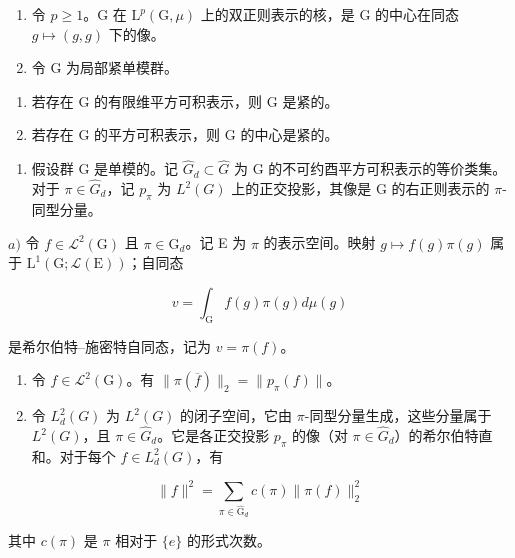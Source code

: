 \begin{enumerate}
\def\labelenumi{\arabic{enumi})}
\setcounter{enumi}{3}
\item
  令 \(p \geqslant 1\)。G 在 \(\mathrm{L}^{p}(\mathrm{G}, \mu)\) 上的双正则表示的核，是 G 的中心在同态 \(g \mapsto (g, g)\) 下的像。
\item
  令 G 为局部紧单模群。
\end{enumerate}

\begin{enumerate}
\def\labelenumi{\alph{enumi})}
\item
  若存在 G 的有限维平方可积表示，则 G 是紧的。
\item
  若存在 G 的平方可积表示，则 G 的中心是紧的。
\end{enumerate}

\begin{enumerate}
\def\labelenumi{\arabic{enumi})}
\setcounter{enumi}{5}
\tightlist
\item
  假设群 G 是单模的。记 \(\widehat{G}_{d} \subset \widehat{G}\) 为 G 的不可约酉平方可积表示的等价类集。对于 \(\pi \in \widehat{G}_{d}\)，记 \(p_{\pi}\) 为 \(L^{2}(G)\) 上的正交投影，其像是 G 的右正则表示的 \(\pi\)-同型分量。
\end{enumerate}

\(a)\) 令 \(f \in \mathcal{L}^2(\mathrm{G})\) 且 \(\pi \in \widehat{\mathrm{G}}_d\)。记 E 为 \(\pi\) 的表示空间。映射 \(g \mapsto f(g)\pi(g)\) 属于 \(\mathrm{L}^1(\mathrm{G};\mathcal{L}(\mathrm{E}))\)；自同态

\[
v = \int_ {\mathrm{G}} f (g) \pi (g) d \mu (g)
\]

是希尔伯特–施密特自同态，记为 \(v = \pi(f)\)。

\begin{enumerate}
\def\labelenumi{\alph{enumi})}
\setcounter{enumi}{1}
\item
  令 \(f \in \mathcal{L}^2(\mathrm{G})\)。有 \(\| \pi(\overline{f}) \|_2 = \| p_\pi(f) \|\)。
\item
  令 \(L_{d}^{2}(G)\) 为 \(L^{2}(G)\) 的闭子空间，它由 \(\pi\)-同型分量生成，这些分量属于 \(L^{2}(G)\)，且 \(\pi \in \widehat{G}_{d}\)。它是各正交投影 \(p_{\pi}\) 的像（对 \(\pi \in \widehat{G}_{d}\)）的希尔伯特直和。对于每个 \(f \in L_{d}^{2}(G)\)，有
\end{enumerate}

\[
\| f \| ^ {2} = \sum_ {\pi \in \widehat {\mathrm{G}} _ {d}} c (\pi) \| \pi (f) \| _ {2} ^ {2}
\]

其中 \(c(\pi)\) 是 \(\pi\) 相对于 \(\{e\}\) 的形式次数。

